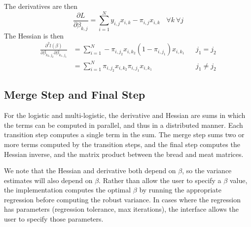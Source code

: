 \documentclass[12pt]{article}
\begin{document}
The derivatives are then
\begin{equation}\label{eq:first_derivative}
\frac{\partial L}{\partial \beta_{k,j}} = \sum_{i=1}^{N} y_{i,j}x_{i,k} - \pi_{i,j}x_{i,k} \ \ \ \ \forall k \  \forall j
\end{equation}
The Hessian is then 
\begin{align}\label{eq:second_derivative}
\frac{\partial^2 l({\beta})}{\partial \beta_{k_2,j_2} \partial \beta_{k_1,j_1}} 
&= \sum_{i=1}^{N} -\pi_{i,j_2}x_{i,k_2}(1-\pi_{i,j_1})x_{i,k_1} &&j_1 = j_2 \\
&= \sum_{i=1}^{N} \pi_{i,j_2}x_{i,k_2}\pi_{i,j_1}x_{i,k_1} &&j_1 \neq j_2 
\end{align}

\subsection{Merge Step and Final Step}

For the logistic and multi-logistic, the derivative and Hessian are sums in which the terms can be computed in parallel, and thus in a distributed manner.  Each transition step computes a single term in the sum.  The merge step sums two or more terms computed by the transition steps, and the final step computes the Hessian inverse, and the matrix product between the bread and meat matrices.  


We note that the Hessian and derivative both depend on $\beta$, so the variance estimates will also depend on $\beta$.  Rather than allow the user to specify a $\beta$ value, the implementation computes the optimal $\beta$ by running the appropriate regression  before computing the robust variance.  In cases where the regression has parameters (regression tolerance, max iterations), the interface allows the user to specify those parameters.

	
\end{document}
